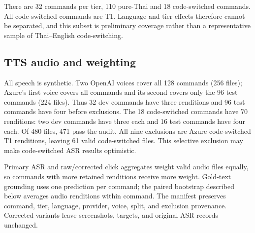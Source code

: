 There are 32 commands per tier, 110 pure-Thai and 18 code-switched commands. All code-switched commands are T1. Language and tier effects therefore cannot be separated, and this subset is preliminary coverage rather than a representative sample of Thai--English code-switching.

\subsection{TTS audio and weighting}

All speech is synthetic. Two OpenAI voices cover all 128 commands (256 files); Azure's first voice covers all commands and its second covers only the 96 test commands (224 files). Thus 32 dev commands have three renditions and 96 test commands have four before exclusions. The 18 code-switched commands have 70 renditions: two dev commands have three each and 16 test commands have four each. Of 480 files, 471 pass the audit. All nine exclusions are Azure code-switched T1 renditions, leaving 61 valid code-switched files. This selective exclusion may make code-switched ASR results optimistic.

Primary ASR and raw/corrected click aggregates weight valid audio files equally, so commands with more retained renditions receive more weight. Gold-text grounding uses one prediction per command; the paired bootstrap described below averages audio renditions within command. The manifest preserves command, tier, language, provider, voice, split, and exclusion provenance. Corrected variants leave screenshots, targets, and original ASR records unchanged.
